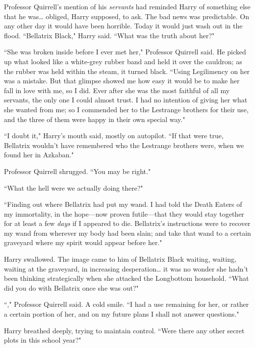 Professor Quirrell's mention of his \emph{servants} had reminded Harry of something else that he was{\ldots} obliged, Harry supposed, to ask. The bad news was predictable. On any other day it would have been horrible. Today it would just wash out in the flood. ``Bellatrix Black," Harry said. ``What was the truth about her?"

``She was broken inside before I ever met her," Professor Quirrell said. He picked up what looked like a white-grey rubber band and held it over the cauldron; as the rubber was held within the steam, it turned black. ``Using Legilimency on her was a mistake. But that glimpse showed me how easy it would be to make her fall in love with me, so I did. Ever after she was the most faithful of all my servants, the only one I could almost trust. I had no intention of giving her what she wanted from me; so I commended her to the Lestrange brothers for their use, and the three of them were happy in their own special way."

``I doubt it," Harry's mouth said, mostly on autopilot. ``If that were true, Bellatrix wouldn't have remembered who the Lestrange brothers were, when we found her in Azkaban."

Professor Quirrell shrugged. ``You may be right."

``What the hell were we actually doing there?"

``Finding out where Bellatrix had put my wand. I had told the Death Eaters of my immortality, in the hope—now proven futile—that they would stay together for at least a few \emph{days} if I appeared to die. Bellatrix's instructions were to recover my wand from wherever my body had been slain; and take that wand to a certain graveyard where my spirit would appear before her."

Harry swallowed. The image came to him of Bellatrix Black waiting, waiting, waiting at the graveyard, in increasing desperation{\ldots} it was no wonder she hadn't been thinking strategically when she attacked the Longbottom household. ``What did you do with Bellatrix once she was out?"

``," Professor Quirrell said. A cold smile. ``I had a use remaining for her, or rather a certain portion of her, and on my future plans I shall not answer questions."

Harry breathed deeply, trying to maintain control. ``Were there any other secret plots in this school year?"


